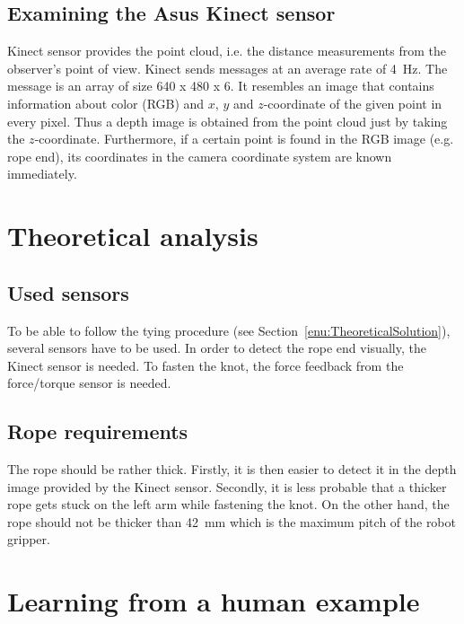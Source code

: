         \subsection{Examining the Asus Kinect sensor}
            Kinect sensor provides the point cloud, i.e. the distance measurements from the observer's point of view. Kinect sends messages at an average rate of \SI{4}{Hz}. The message is an array of size 640 x 480 x 6. It resembles an image that contains information about color (RGB) and $x$, $y$ and $z$-coordinate of the given point in every pixel. Thus a depth image is obtained from the point cloud just by taking the $z$-coordinate. Furthermore, if a certain point is found in the RGB image (e.g. rope end), its coordinates in the camera coordinate system are known immediately.

    \section{Theoretical analysis}

        \subsection{Used sensors}
            To be able to follow the tying procedure (see Section~\ref{enu:TheoreticalSolution}), several sensors have to be used. In order to detect the rope end visually, the Kinect sensor is needed. To fasten the knot, the force feedback from the force/torque sensor is needed.

        \subsection{Rope requirements}
            The rope should be rather thick. Firstly, it is then easier to detect it in the depth image provided by the Kinect sensor. Secondly, it is less probable that a thicker rope gets stuck on the left arm while fastening the knot. On the other hand, the rope should not be thicker than \SI{42}{mm} which is the maximum pitch of the robot gripper.


    \section{Learning from a human example}

